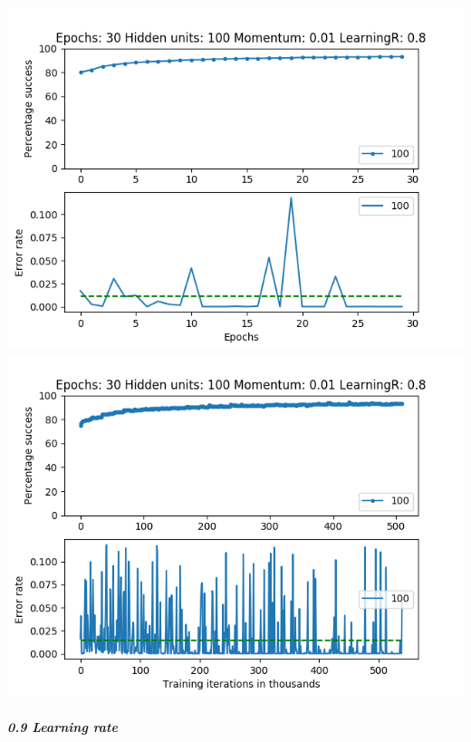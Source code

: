 \documentclass[11pt]{article}
\makeatletter
\def\maxwidth{\ifdim\Gin@nat@width>\linewidth\linewidth
    \else\Gin@nat@width\fi}
\let\Oldincludegraphics\includegraphics
\renewcommand{\includegraphics}[1]{\Oldincludegraphics[width=.8\maxwidth]{#1}}
\makeatother
\begin{document}
\includegraphics{Experiment2/E2_NN_Epoch_Momentum_0.01_30Epochs_100_LR_0.8_Hiddenunits.png}
\includegraphics{Experiment2/E2_NN_Training_Momentum_0.01_30Epochs_100_LR_0.8_Hiddenunits.png}

\hypertarget{learning-rate-9}{%
\subparagraph{0.9 Learning rate}\label{learning-rate-9}}
\end{document}
